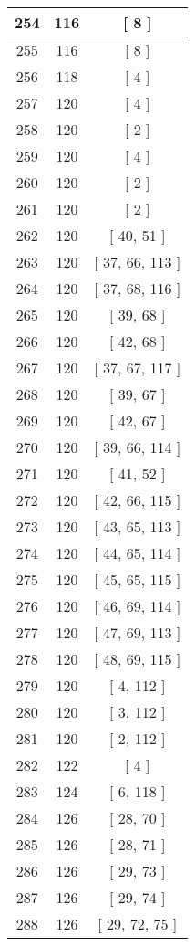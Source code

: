\begin{center}
\begin{longtable}[H]{|| c c c ||}
\hline
254 & 116 & [ 8 ] \\ 
\hline
255 & 116 & [ 8 ] \\ 
\hline
256 & 118 & [ 4 ] \\ 
\hline
257 & 120 & [ 4 ] \\ 
\hline
258 & 120 & [ 2 ] \\ 
\hline
259 & 120 & [ 4 ] \\ 
\hline
260 & 120 & [ 2 ] \\ 
\hline
261 & 120 & [ 2 ] \\ 
\hline
262 & 120 & [ 40, 51 ] \\ 
\hline
263 & 120 & [ 37, 66, 113 ] \\ 
\hline
264 & 120 & [ 37, 68, 116 ] \\ 
\hline
265 & 120 & [ 39, 68 ] \\ 
\hline
266 & 120 & [ 42, 68 ] \\ 
\hline
267 & 120 & [ 37, 67, 117 ] \\ 
\hline
268 & 120 & [ 39, 67 ] \\ 
\hline
269 & 120 & [ 42, 67 ] \\ 
\hline
270 & 120 & [ 39, 66, 114 ] \\ 
\hline
271 & 120 & [ 41, 52 ] \\ 
\hline
272 & 120 & [ 42, 66, 115 ] \\ 
\hline
273 & 120 & [ 43, 65, 113 ] \\ 
\hline
274 & 120 & [ 44, 65, 114 ] \\ 
\hline
275 & 120 & [ 45, 65, 115 ] \\ 
\hline
276 & 120 & [ 46, 69, 114 ] \\ 
\hline
277 & 120 & [ 47, 69, 113 ] \\ 
\hline
278 & 120 & [ 48, 69, 115 ] \\ 
\hline
279 & 120 & [ 4, 112 ] \\ 
\hline
280 & 120 & [ 3, 112 ] \\ 
\hline
281 & 120 & [ 2, 112 ] \\ 
\hline
282 & 122 & [ 4 ] \\ 
\hline
283 & 124 & [ 6, 118 ] \\ 
\hline
284 & 126 & [ 28, 70 ] \\ 
\hline
285 & 126 & [ 28, 71 ] \\ 
\hline
286 & 126 & [ 29, 73 ] \\ 
\hline
287 & 126 & [ 29, 74 ] \\ 
\hline
288 & 126 & [ 29, 72, 75 ] \\ 

\end{longtable}
\end{center}
